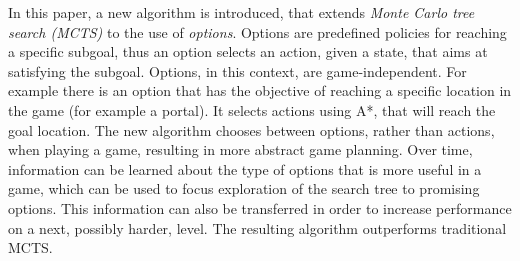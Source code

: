 
In this paper, a new algorithm is introduced, that extends \emph{Monte Carlo
tree search (MCTS)} to the use of \emph{options}. Options are predefined
policies for reaching a specific subgoal, thus an option selects an action,
given a state, that aims at satisfying the subgoal. Options, in this context,
are game-independent. For example there is an option that has the objective of
reaching a specific location in the game (for example a portal). It
selects actions using A*, that will reach the goal location.
The new algorithm chooses between options, rather than actions, when playing a
game, resulting in more abstract game planning. Over time, information can be
learned about the type of options that is more useful in a game, which can be
used to focus exploration of the search tree to promising options. This
information can also be transferred in order to increase performance on a next,
possibly harder, level. The resulting algorithm outperforms traditional MCTS.
